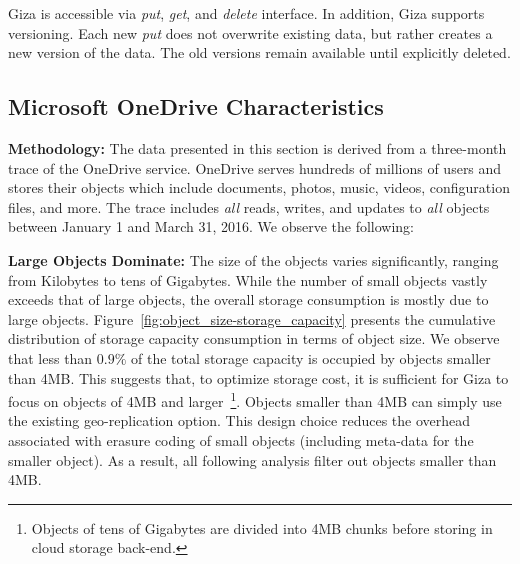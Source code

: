 Giza is accessible via {\em put}, {\em get}, and {\em delete} interface. In
addition, Giza supports versioning. Each new {\em put} does not overwrite
existing data, but rather creates a new version of the data. The old versions
remain available until explicitly deleted.

\subsection{Microsoft OneDrive Characteristics}


{\bf Methodology:} The data presented in this section is derived from a three-month trace of the OneDrive service. OneDrive serves hundreds of millions of users and stores their objects which include documents, photos, music, videos, configuration files, and more. The trace includes {\em all} reads, writes, and updates to {\em all} objects between January 1 and March 31, 2016. We observe the following:

{\bf Large Objects Dominate:} The size of the objects varies significantly, ranging from Kilobytes to tens of Gigabytes. While the number of small objects vastly exceeds that of large objects, the overall storage consumption is mostly due to large objects. Figure~\ref{fig:object_size-storage_capacity} presents the cumulative distribution of storage capacity consumption in terms of object size. We observe that less than $0.9\%$ of the total storage capacity is occupied by objects smaller than 4MB. This suggests that, to optimize storage cost, it is sufficient for Giza to focus on objects of 4MB and larger~\footnote{Objects of tens of Gigabytes are divided into 4MB chunks before storing in cloud storage back-end.}. Objects smaller than 4MB can simply use the existing geo-replication option. This design choice reduces the overhead associated with erasure coding of small objects (including meta-data for the smaller object). As a result, all following analysis filter out objects smaller than 4MB.


